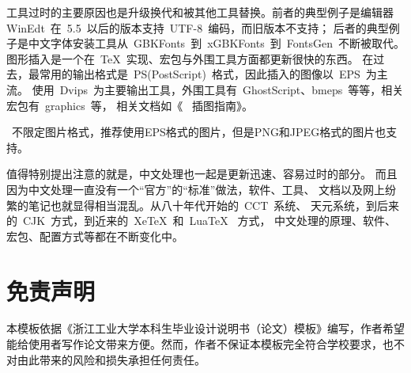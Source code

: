 工具过时的主要原因也是升级换代和被其他工具替换。前者的典型例子是编辑器
WinEdt~在~5.5~以后的版本支持~UTF-8~编码，而旧版本不支持；
后者的典型例子是中文字体安装工具从~GBKFonts~到~xGBKFonts~到~FontsGen~不断被取代。
图形插入是一个在~\TeX~实现、宏包与外围工具方面都更新很快的东西。
在过去，最常用的输出格式是~PS(PostScript)~格式，因此插入的图像以~EPS~为主流。
使用~Dvips~为主要输出工具，外围工具有~GhostScript、bmeps~等等，相关宏包有~graphics~等，
相关文档如《\LaTeXe{}~ 插图指南》。

\XeLaTeX~不限定图片格式，推荐使用EPS格式的图片，但是PNG和JPEG格式的图片也支持。

值得特别提出注意的就是，中文处理也一起是更新迅速、容易过时的部分。
而且因为中文处理一直没有一个“官方”的“标准”做法，软件、工具、
文档以及网上纷繁的笔记也就显得相当混乱。从八十年代开始的~CCT~系统、
天元系统，到后来的~CJK~方式，到近来的~XeTeX~和~LuaTeX~ 方式，
中文处理的原理、软件、宏包、配置方式等都在不断变化中。

\section{免责声明}

本模板依据《浙江工业大学本科生毕业设计说明书（论文）模板》编写，作者希望能给使用者写作论文带来方便。然而，作者不保证本模板完全符合学校要求，也不对由此带来的风险和损失承担任何责任。